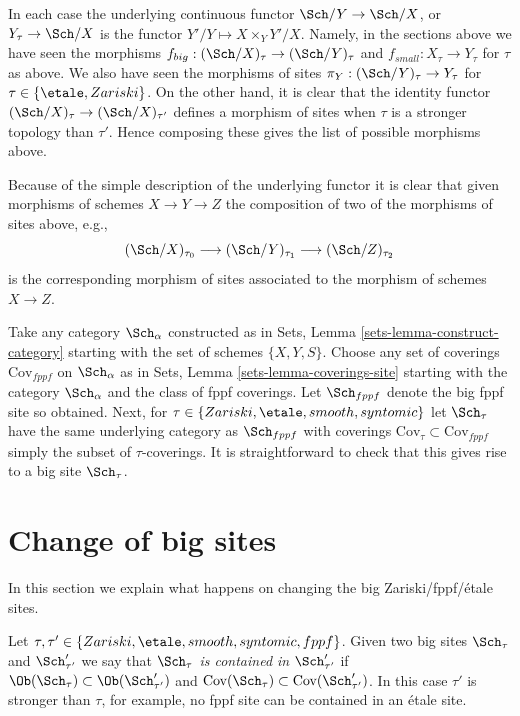 In each case the underlying continuous functor
$\Sch/Y \to \Sch/X$, or
$Y_\tau \to \Sch/X$
is the functor $Y'/Y \mapsto X \times_Y Y'/X$. Namely, in the sections
above we have seen the morphisms
$f_{big} : (\Sch/X)_\tau \to (\Sch/Y)_\tau$
and
$f_{small} : X_\tau \to Y_\tau$
for $\tau$ as above.
We also have seen the morphisms of sites
$\pi_Y : (\Sch/Y)_\tau \to Y_\tau$ for
$\tau \in \{\etale, Zariski\}$.
On the other hand, it is clear that the identity functor
$(\Sch/X)_\tau \to (\Sch/X)_{\tau'}$ defines
a morphism of sites when $\tau$ is a stronger topology than
$\tau'$. Hence composing these gives the list of possible morphisms
above.

\medskip\noindent
Because of the simple description of the underlying functor it
is clear that given morphisms of schemes $X \to Y \to Z$ the
composition of two of the morphisms of sites above, e.g.,
$$
(\Sch/X)_{\tau_0} \longrightarrow
(\Sch/Y)_{\tau_1} \longrightarrow
(\Sch/Z)_{\tau_2}
$$
is the corresponding morphism of sites associated to the morphism
of schemes $X \to Z$.

\begin{remark}
\label{remark-choice-sites}
Take any category $\Sch_\alpha$ constructed as in
Sets, Lemma \ref{sets-lemma-construct-category}
starting with the set of schemes $\{X, Y, S\}$. Choose any set of
coverings $\text{Cov}_{fppf}$ on $\Sch_\alpha$ as in
Sets, Lemma \ref{sets-lemma-coverings-site}
starting with the category $\Sch_\alpha$ and the class of fppf
coverings. Let $\Sch_{fppf}$ denote the big fppf site so
obtained. Next, for $\tau \in \{Zariski, \etale, smooth, syntomic\}$
let $\Sch_\tau$ have the same underlying category as
$\Sch_{fppf}$ with coverings
$\text{Cov}_\tau \subset \text{Cov}_{fppf}$ simply the subset of
$\tau$-coverings. It is straightforward to check that this gives rise
to a big site $\Sch_\tau$.
\end{remark}









\section{Change of big sites}
\label{section-change-alpha}

\noindent
In this section we explain what happens on changing the big
Zariski/fppf/\'etale sites.

\medskip\noindent
Let $\tau, \tau' \in \{Zariski, \etale, smooth, syntomic, fppf\}$.
Given two big sites $\Sch_\tau$ and $\Sch'_{\tau'}$
we say that
{\it $\Sch_\tau$ is contained in $\Sch'_{\tau'}$} if
$\Ob(\Sch_\tau) \subset \Ob(\Sch'_{\tau'})$
and
$\text{Cov}(\Sch_\tau) \subset \text{Cov}(\Sch'_{\tau'})$.
In this case $\tau'$ is stronger than $\tau$, for example, no fppf
site can be contained in an \'etale site.


